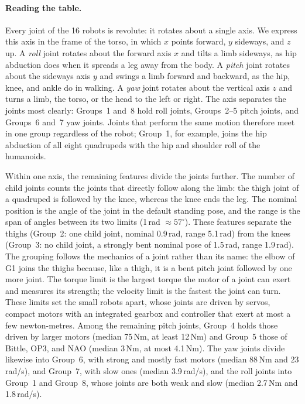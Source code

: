 \paragraph{Reading the table.}
Every joint of the 16 robots is revolute: it rotates about a single axis. We express this axis in the frame of the
torso, in which $x$ points forward, $y$ sideways, and $z$ up. A \emph{roll} joint rotates about the forward axis $x$
and tilts a limb sideways, as hip abduction does when it spreads a leg away from the body. A \emph{pitch} joint
rotates about the sideways axis $y$ and swings a limb forward and backward, as the hip, knee, and ankle do in walking.
A \emph{yaw} joint rotates about the vertical axis $z$ and turns a limb, the torso, or the head to the left or right.
The axis separates the joints most clearly: Groups~1 and~8 hold roll joints, Groups~2--5 pitch joints, and Groups~6
and~7 yaw joints. Joints that perform the same motion therefore meet in one group regardless of the robot; Group~1,
for example, joins the hip abduction of all eight quadrupeds with the hip and shoulder roll of the humanoids.

Within one axis, the remaining features divide the joints further. The number of child joints counts the joints that
directly follow along the limb: the thigh joint of a quadruped is followed by the knee, whereas the knee ends the
leg. The nominal position is the angle of the joint in the default standing pose, and the range is the span of
angles between its two limits (1\,rad $\approx 57^\circ$). These features separate the thighs (Group~2: one child
joint, nominal 0.9\,rad, range 5.1\,rad) from the knees (Group~3: no child joint, a strongly bent nominal pose of
1.5\,rad, range 1.9\,rad). The grouping follows the mechanics of a joint rather than its name: the elbow of G1 joins
the thighs because, like a thigh, it is a bent pitch joint followed by one more joint. The torque limit is the
largest torque the motor of a joint can exert and measures its strength; the velocity limit is the fastest the joint
can turn. These limits set the small robots apart, whose joints are driven by servos, compact motors with an
integrated gearbox and controller that exert at most a few newton-metres. Among the remaining pitch joints, Group~4
holds those driven by larger motors (median 75\,Nm, at least 12\,Nm) and Group~5 those of Bittle, OP3, and NAO
(median 3\,Nm, at most 4.1\,Nm). The yaw joints divide likewise into Group~6, with strong and mostly fast motors
(median 88\,Nm and 23\,rad/s), and Group~7, with slow ones (median 3.9\,rad/s), and the roll joints into Group~1 and
Group~8, whose joints are both weak and slow (median 2.7\,Nm and 1.8\,rad/s).

